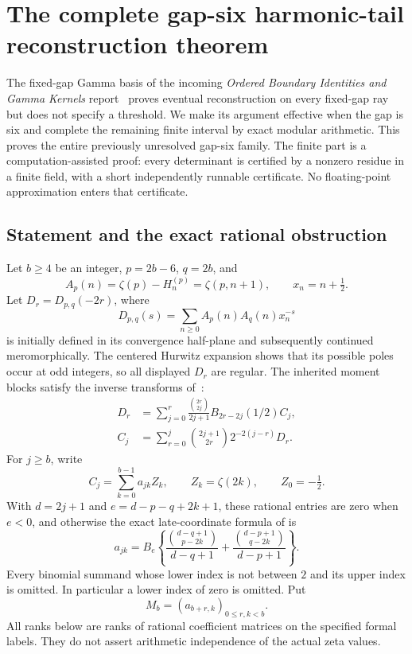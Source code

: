\documentclass[11pt,a4paper]{article}
\theoremstyle{definition}
\theoremstyle{remark}
\numberwithin{equation}{section}
\begin{document}
\section{The complete gap-six harmonic-tail reconstruction theorem}
\label{gs:section}

The fixed-gap Gamma basis of the incoming \emph{Ordered Boundary
Identities and Gamma Kernels} report~\cite{OrderedIncoming} proves eventual reconstruction
on every fixed-gap ray but does not specify a threshold.  We make its
argument effective when the gap is six and complete the remaining
finite interval by exact modular arithmetic.  This proves the entire
previously unresolved gap-six family.  The finite part is a
computation-assisted proof: every determinant is certified by a
nonzero residue in a finite field, with a short independently runnable
certificate.  No floating-point approximation enters that certificate.

\subsection{Statement and the exact rational obstruction}

Let $b\ge4$ be an integer, $p=2b-6$, $q=2b$, and
\[
 A_p(n)=\zeta(p)-H_n^{(p)}=\zeta(p,n+1),\qquad x_n=n+\tfrac12.
\]
Let $D_r=D_{p,q}(-2r)$, where
\[
 D_{p,q}(s)=\sum_{n\ge0}A_p(n)A_q(n)x_n^{-s}
\]
is initially defined in its convergence half-plane and subsequently
continued meromorphically.  The centered Hurwitz expansion shows that
its possible poles occur at odd integers, so all displayed $D_r$ are
regular.  The inherited moment blocks satisfy the inverse transforms
of~\cite[Section~8]{OrderedIncoming}:
\begin{align}
 D_r&=\sum_{j=0}^r\frac{\binom{2r}{2j}}{2j+1}
           B_{2r-2j}(1/2)C_j,\label{gs:forward}\\
 C_j&=\sum_{r=0}^j\binom{2j+1}{2r}2^{-2(j-r)}D_r.
 \label{gs:backward}
\end{align}
For $j\ge b$, write
\begin{equation}\label{gs:late}
 C_j=\sum_{k=0}^{b-1}a_{jk}Z_k,
 \qquad Z_k=\zeta(2k),\qquad Z_0=-\tfrac12.
\end{equation}
With $d=2j+1$ and $e=d-p-q+2k+1$, these rational entries are zero
when $e<0$, and otherwise the exact late-coordinate formula of
\cite[Section~8]{OrderedIncoming} is
\begin{equation}\label{gs:entry}
 a_{jk}=B_e\left\{
  \frac{\binom{d-q+1}{p-2k}}{d-q+1}
 +\frac{\binom{d-p+1}{q-2k}}{d-p+1}\right\}.
\end{equation}
Every binomial summand whose lower index is not between $2$ and its
upper index is omitted.  In particular a lower index of zero is
omitted.  Put
\[
 M_b=(a_{b+r,k})_{0\le r,k<b}.
\]
All ranks below are ranks of rational coefficient matrices on the
specified formal labels.  They do not assert arithmetic independence
of the actual zeta values.
\end{document}
